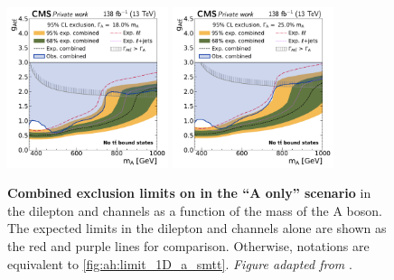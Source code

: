 \begin{figure}[!ph]
    \\
    \includegraphics[width=0.42\textwidth]{figures/ah/limits_combined/smtt/A_limit_w18p0_g-scan.pdf}%
    \hspace*{0.05\textwidth}%
    \includegraphics[width=0.42\textwidth]{figures/ah/limits_combined/smtt/A_limit_w25p0_g-scan.pdf}
    \caption{%
        \textbf{Combined exclusion limits on \gAtt in the ``A only'' scenario} in the dilepton and \ljets channels as a function of the mass of the A boson. The expected limits in the dilepton and \ljets channels alone are shown as the red and purple lines for comparison. Otherwise, notations are equivalent to \cref{fig:ah:limit_1D_a_smtt}. \textit{Figure adapted from }.
    }
    \label{fig:ah:limit_1D_a_smtt_lx}
\end{figure}
    
